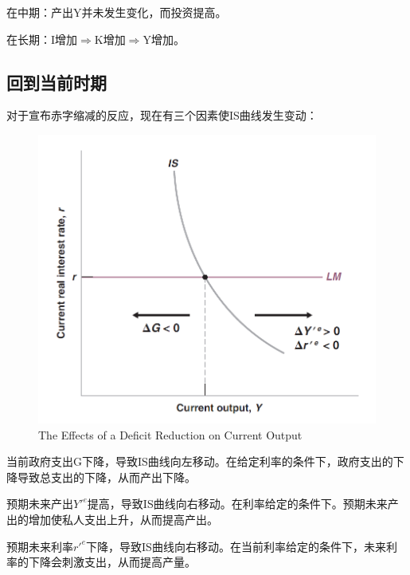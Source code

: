\documentclass{article}
\begin{document}
\hspace*{\fill}

在中期：产出Y并未发生变化，而投资提高。

在长期：I增加$ \Rightarrow $K增加$ \Rightarrow $Y增加。


\subsection{回到当前时期}

对于宣布赤字缩减的反应，现在有三个因素使IS曲线发生变动：

\begin{figure}[H] %
	\centering %
	\includegraphics[width=1\textwidth]{16_5} %
	\caption{The Effects of a Deficit
		Reduction on Current
		Output} %
	\label{Fig.main6} %
\end{figure}


当前政府支出G下降，导致IS曲线向左移动。在给定利率的条件下，政府支出的下降导致总支出的下降，从而产出下降。

预期未来产出$ Y'^e $提高，导致IS曲线向右移动。在利率给定的条件下。预期未来产出的增加使私人支出上升，从而提高产出。

预期未来利率$ r'^e $下降，导致IS曲线向右移动。在当前利率给定的条件下，未来利率的下降会刺激支出，从而提高产量。

\hspace*{\fill}
\end{document}
